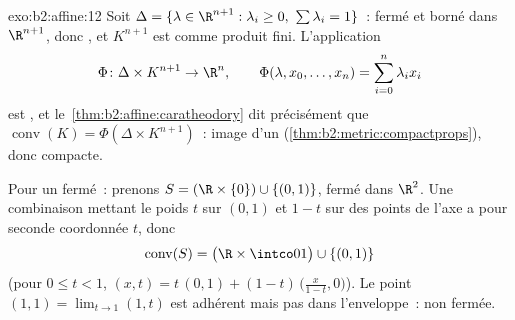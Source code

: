 \begin{solution}{exo:b2:affine:12}
Soit $\Delta = \{\lambda \in \R^{n+1} : \lambda_i \geq 0,\
\sum\lambda_i = 1\}$~: fermé et borné dans $\R^{n+1}$, donc
, et $K^{n+1}$ est  comme produit fini. L'application
\[
\Phi \colon \Delta \times K^{n+1} \to \R^n, \qquad
\Phi(\lambda, x_0, \dots, x_n) = \sum_{i=0}^n \lambda_i x_i
\]
est , et le~\cref{thm:b2:affine:caratheodory} dit
précisément que $\operatorname{conv}(K) = \Phi(\Delta \times
K^{n+1})$~: image  d'un 
(\cref{thm:b2:metric:compactprops}), donc compacte.

Pour un fermé~: prenons $S = (\R \times \{0\}) \cup \{(0,
1)\}$, fermé dans $\R^2$. Une combinaison  mettant le poids
$t$ sur $(0,1)$ et $1 - t$ sur des points de l'axe a pour seconde
coordonnée $t$, donc
\[
\operatorname{conv}(S) = \bigl(\R \times \intco01\bigr) \cup
\{(0,1)\}
\]
(pour $0 \leq t < 1$, $(x, t) = t\,(0,1) + (1-t)\,\bigl(\tfrac
x{1-t}, 0\bigr)$). Le point $(1, 1) = \lim_{t \to 1}(1, t)$
est adhérent mais pas dans l'enveloppe~: non fermée.
\end{solution}

